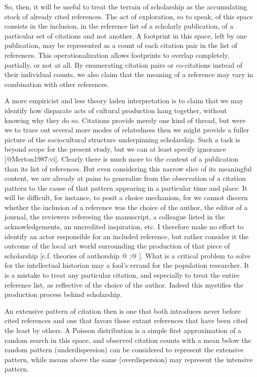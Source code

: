 So, then, it will be useful to treat the terrain of scholarship as the
accumulating stock of already cited references. The act of exploration,
so to speak, of this space consists in the inclusion, in the reference
list of a scholarly publication, of a particular set of citations and
not another. A footprint in this space, left by one publication, may be
represented as a count of each citation pair in the list of references.
This operationalization allows footprints to overlap completely,
partially, or not at all. By enumerating citation pairs or co-citations
instead of their individual counts, we also claim that the meaning of a
reference may vary in combination with other references.

A more empiricist and less theory laden interpretation is to claim that
we may identify how disparate acts of cultural production hang together,
without knowing why they do so. Citations provide merely one kind of
thread, but were we to trace out several more modes of relatedness then
we might provide a fuller picture of the sociocultural structure
underpinning scholarship. Such a task is beyond scope for the present
study, but we can at least specify ignorance [@Merton1987:vi]. Clearly
there is much more to the content of a publication than its list of
references. But even considering this narrow slice of its meaningful
content, we are already at pains to generalize from the observation of a
citation pattern to the cause of that pattern appearing in a particular
time and place. It will be difficult, for instance, to posit a choice
mechanism, for we cannot discern whether the inclusion of a reference
was the choice of the author, the editor of a journal, the reviewers
refereeing the manuscript, a colleague listed in the acknowledgements,
an uncredited inspiration, etc. I therefore make no effort to identify
an actor responsible for an included reference, but rather consider it
the outcome of the local art world surrounding the production of that
piece of scholarship [c.f. theories of authorship @ ;@ ]. What is a
critical problem to solve for the intellectual historian may a fool's
errand for the population researcher. It is a mistake to treat any
particular citation, and especially to treat the entire reference list,
as reflective of the choice of the author. Indeed this mystifies the
production process behind scholarship.

An extensive pattern of citation then is one that both introduces never
before cited references and one that favors those extant references that
have been cited the least by others. A Poisson distribution is a simple
first approximation of a random search in this space, and observed
citation counts with a mean below the random pattern (underdispersion)
can be considered to represent the extensive pattern, while means above
the same (overdispersion) may represent the intensive pattern.

